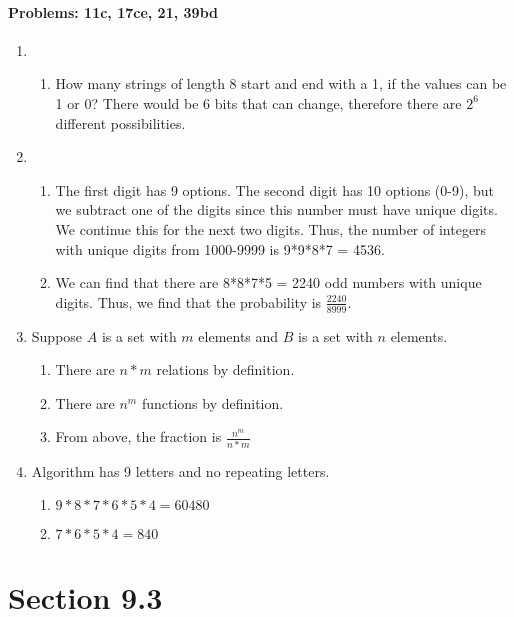 \documentclass{article}
\makeatletter
\newcommand\setItemnumber[1]{\setcounter{enum\romannumeral\@enumdepth}{\numexpr#1-1\relax}}
\makeatother
\begin{document}
\paragraph{Problems: 11c, 17ce, 21, 39bd}
\begin{enumerate}
\setItemnumber{11}
    \item
    \begin{enumerate}
    \setItemnumber{3}
    \item How many strings of length 8 start and end with a 1, if the values can be 1 or 0?
    There would be 6 bits that can change, therefore there are $2^6$ different possibilities.
    \end{enumerate}
    \setItemnumber{17}
    \item 
    \begin{enumerate}
        \setItemnumber{3}
        \item The first digit has 9 options. The second digit has 10 options (0-9), but we subtract one of the digits since this number must have unique digits. We continue this for the next two digits. Thus, the number of integers with unique digits from 1000-9999 is 9*9*8*7 = 4536.
        \setItemnumber{5}
        \item We can find that there are 8*8*7*5 = 2240 odd numbers with unique digits. Thus, we find that the probability is $\frac{2240}{8999}$.
    \end{enumerate}
    \setItemnumber{21}
    \item Suppose $A$ is a set with $m$ elements and $B$ is a set with $n$ elements.
    \begin{enumerate}
        \item There are $n*m$ relations by definition.
        \item There are $n^m$ functions by definition.
        \item From above, the fraction is $\frac{n^m}{n*m}$
    \end{enumerate}
    \setItemnumber{39}
    \item Algorithm has 9 letters and no repeating letters.
    \begin{enumerate}
    \setItemnumber{2}
    \item $9*8*7*6*5*4 = 60480$
        \setItemnumber{4}
        \item $7*6*5*4 = 840$
    \end{enumerate}
\end{enumerate}
\section{Section 9.3}
\end{document}
